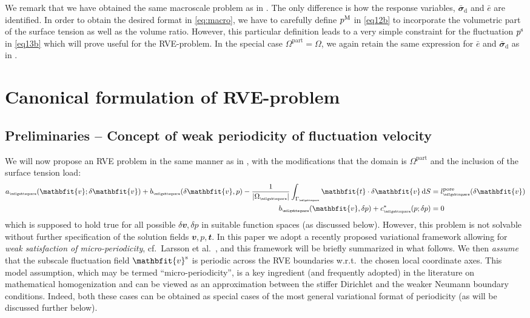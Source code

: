 \documentclass[12pt,a4paper]{article}
\renewcommand{\ta}[1]{\mathbfit{#1}}
\renewcommand{\ts}[1]{\mathbfit{#1}}
\renewcommand{\Box}{\mdlgwhtsquare}
\renewcommand{\dev}{\mathrm{d}}
\newcommand{\volume}{|\Omega_\rve|}
\newcommand{\pore}{\mathrm{pore}}
\newcommand{\particle}{\mathrm{part}}
\newcommand{\rve}{
  {\mathchoice
   {\mbox{\scalebox{0.67}{$\Box$}}}
   {\mbox{\scalebox{0.67}{$\Box$}}}
   {\mbox{\scalebox{0.5}{$\Box$}}}
   {\mbox{\scalebox{0.375}{$\Box$}}}
  }
}
\begin{document}
We remark that we have obtained the same macroscale problem as in \cite{ohman_variationally_2014}.
The only difference is how the response variables, $\bar{\ts\sigma}_\dev$ and $\bar{e}$ are identified.
In order to obtain the desired format in \eqref{eq:macro}, we have to carefully define $p^{\mathrm{M}}$ in \eqref{eq12b} to incorporate the volumetric part of the surface tension as well as the volume ratio. However, this particular definition leads to a very simple constraint for the fluctuation $p^{\mathrm{s}}$ in \eqref{eq13b} which will prove useful for the RVE-problem.
In the special case $\Omega^\particle = \Omega$, we again retain the same expression for $\bar{e}$ and $\bar{\ts\sigma}_\dev$ as in \cite{ohman_variationally_2014}.



\section{Canonical formulation of RVE-problem}

\subsection{Preliminaries -- Concept of weak periodicity of fluctuation velocity}

We will now propose an RVE problem in the same manner as in \cite{ohman_variationally_2014}, with the modifications that the domain is $\Omega^\particle$ and the inclusion of the surface tension load:
\begin{subequations}
\begin{align}
    a_\rve(\ta v;\delta\ta v) + b_\rve(\delta\ta v,p) - \frac{1}{\volume}\int_{\Gamma_\rve} \ta{t}\cdot\delta\ta v \dif S &= l_\rve^\pore(\delta\ta v)
\label{eq19a} \\
    b_\rve(\ta v,\delta p) + c^*_\rve(p;\delta p) &= 0
\label{eq19b}
\end{align}
\end{subequations}
which is supposed to hold true for all possible $\delta\ta v, \delta p$ in suitable function spaces (as discussed below).
However, this problem is not solvable without further specification of the solution fields $\ta v, p, \ta{t}$.
In this paper we adopt a recently proposed variational framework allowing for \emph{weak satisfaction of micro-periodicity}, cf.\  Larsson et al.\ \cite{larsson_computational_2011}, and this framework will be briefly summarized in what follows.
We then \emph{assume} that the subscale fluctuation field $\ta v^\fluct$ is periodic across the RVE boundaries w.r.t.\ the chosen local coordinate axes.
This model assumption, which may be termed ``micro-periodicity'', is a key ingredient (and frequently adopted) in the literature on mathematical homogenization and can be viewed as an approximation between the stiffer Dirichlet and the weaker Neumann boundary conditions.
Indeed, both these cases can be obtained as special cases of the most general variational format of periodicity (as will be discussed further below).
\end{document}
